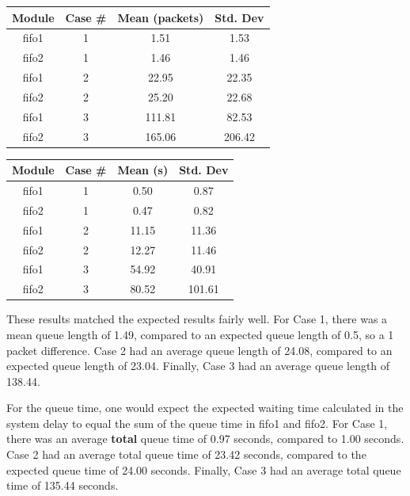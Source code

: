\documentclass{article}
\begin{document}
\begin{minipage}{0.5\textwidth}
	\centering
	\begin{tabular}{|c|c|c|c|} \hline
		\textbf{Module} & \textbf{Case \#} & \textbf{Mean (packets)} & \textbf{Std. Dev} \\ \hline
	 fifo1 & 1 & 1.51 & 1.53 \\ \hline
	 fifo2 & 1 & 1.46 & 1.46 \\ \hline
	 fifo1 & 2 & 22.95 & 22.35 \\ \hline
	 fifo2 & 2 & 25.20 & 22.68 \\ \hline
	 fifo1 & 3 & 111.81 & 82.53 \\ \hline
	 fifo2 & 3 & 165.06 & 206.42 \\ \hline
	\end{tabular}
	\label{qlen}
\end{minipage}  
\begin{minipage}{0.5\textwidth}
	\centering
	\begin{tabular}{|c|c|c|c|} \hline
		\textbf{Module} & \textbf{Case \#} & \textbf{Mean (s)} & \textbf{Std. Dev} \\ \hline
		fifo1 & 1 & 0.50 & 0.87 \\ \hline
		fifo2 & 1 & 0.47 & 0.82 \\ \hline
		fifo1 & 2 & 11.15 & 11.36 \\ \hline
		fifo2 & 2 & 12.27 & 11.46 \\ \hline
		fifo1 & 3 & 54.92 & 40.91 \\ \hline
		fifo2 & 3 & 80.52 & 101.61 \\ \hline
	\end{tabular}
	\label{qTime}
\end{minipage}

These results matched the expected results fairly well.
For Case 1, there was a mean queue length of 1.49, compared to an expected queue length of 0.5, so a 1 packet difference.
Case 2 had an average queue length of 24.08, compared to an expected queue length of 23.04.
Finally, Case 3 had an average queue length of 138.44.

For the queue time, one would expect the expected waiting time calculated in the system delay to equal the sum of the queue time in fifo1 and fifo2.
For Case 1, there was an average \textbf{total} queue time of 0.97 seconds, compared to 1.00 seconds.
Case 2 had an average total queue time of 23.42 seconds, compared to the expected queue time of 24.00 seconds.
Finally, Case 3 had an average total queue time of 135.44 seconds.
\end{document}

